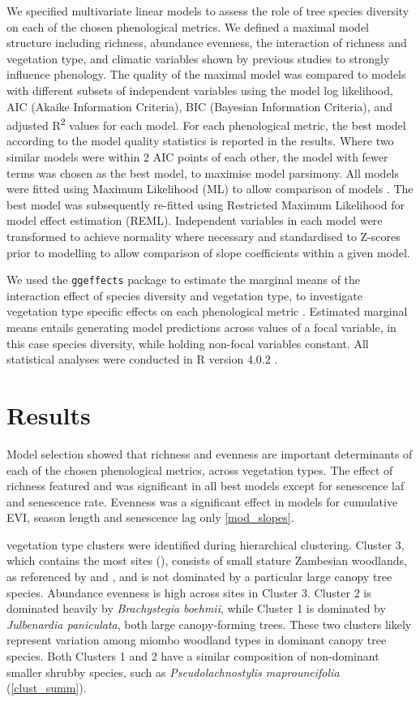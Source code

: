 \documentclass[11pt,a4paper]{article}
\begin{document}
We specified multivariate linear models to assess the role of tree species diversity on each of the chosen phenological metrics. We defined a maximal model structure including richness, abundance evenness, the interaction of richness and vegetation type, and climatic variables shown by previous studies to strongly influence phenology. The quality of the maximal model was compared to models with different subsets of independent variables using the model log likelihood, AIC (Akaike Information Criteria), BIC (Bayesian Information Criteria), and adjusted R\textsuperscript{2} values for each model. For each phenological metric, the best model according to the model quality statistics is reported in the results. Where two similar models were within 2 AIC points of each other, the model with fewer terms was chosen as the best model, to maximise model parsimony. All models were fitted using Maximum Likelihood (ML) to allow comparison of models \citep{}. The best model was subsequently re-fitted using Restricted Maximum Likelihood for model effect estimation (REML). Independent variables in each model were transformed to achieve normality where necessary and standardised to Z-scores prior to modelling to allow comparison of slope coefficients within a given model. 

We used the \texttt{ggeffects} package to estimate the marginal means of the interaction effect of species diversity and vegetation type, to investigate vegetation type specific effects on each phenological metric \citep{ggeffects}. Estimated marginal means entails generating model predictions across values of a focal variable, in this case species diversity, while holding non-focal variables constant. All statistical analyses were conducted in R version 4.0.2 \citep{R2020}.

\section{Results}

Model selection showed that richness and evenness are important determinants of each of the chosen phenological metrics, across vegetation types. The effect of richness featured and was significant in all best models except for senescence laf and senescence rate. Evenness was a significant effect in models for cumulative EVI, season length and senescence lag only \autoref{mod_slopes}. 

\nCluster{} vegetation type clusters were identified during hierarchical clustering. Cluster 3, which contains the most sites (\nClusterC{}), consists of small stature Zambesian woodlands, as referenced by \citet{Dinerstein2017} and \citet{Chidumayo2001}, and is not dominated by a particular large canopy tree species. Abundance evenness is high across sites in Cluster 3. Cluster 2 is dominated heavily by \textit{Brachystegia boehmii}, while Cluster 1 is dominated by \textit{Julbenardia paniculata}, both large canopy-forming trees. These two clusters likely represent variation among miombo woodland types in dominant canopy tree species. Both Clusters 1 and 2 have a similar composition of non-dominant smaller shrubby species, such as \textit{Pseudolachnostylis maprouneifolia} (\autoref{clust_summ}).
\end{document}
